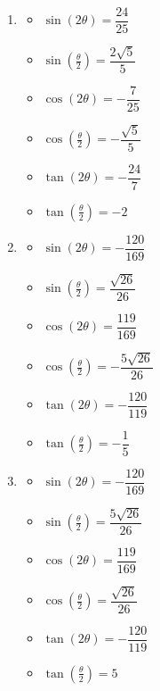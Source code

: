 \begin{enumerate}
\item \begin{multicols}{3}

\begin{itemize}

\item $\sin(2\theta) = \dfrac{24}{25}$
\item $\sin\left(\frac{\theta}{2}\right) = \dfrac{2\sqrt{5}}{5}$
\item $\cos(2\theta) = -\dfrac{7}{25}$
\item $\cos\left(\frac{\theta}{2}\right) = -\dfrac{\sqrt{5}}{5}$
\item $\tan(2\theta)=-\dfrac{24}{7} $
\item $\tan\left(\frac{\theta}{2}\right) = -2$

\end{itemize}

\end{multicols}

\item \begin{multicols}{3}

\begin{itemize}

\item $\sin(2\theta) = -\dfrac{120}{169}$
\item $\sin\left(\frac{\theta}{2}\right) = \dfrac{\sqrt{26}}{26}$
\item $\cos(2\theta) = \dfrac{119}{169}$
\item $\cos\left(\frac{\theta}{2}\right) = -\dfrac{5\sqrt{26}}{26}$
\item $\tan(2\theta)=-\dfrac{120}{119}$
\item $\tan\left(\frac{\theta}{2}\right) = -\dfrac{1}{5}$

\end{itemize}

\end{multicols}

\item \begin{multicols}{3}

\begin{itemize}

\item $\sin(2\theta) = -\dfrac{120}{169}$
\item $\sin\left(\frac{\theta}{2}\right) = \dfrac{5\sqrt{26}}{26}$
\item $\cos(2\theta) = \dfrac{119}{169}$
\item $\cos\left(\frac{\theta}{2}\right) = \dfrac{\sqrt{26}}{26}$
\item $\tan(2\theta)=-\dfrac{120}{119}$
\item $\tan\left(\frac{\theta}{2}\right) = 5$


\end{itemize}
\end{multicols}
\end{enumerate}
